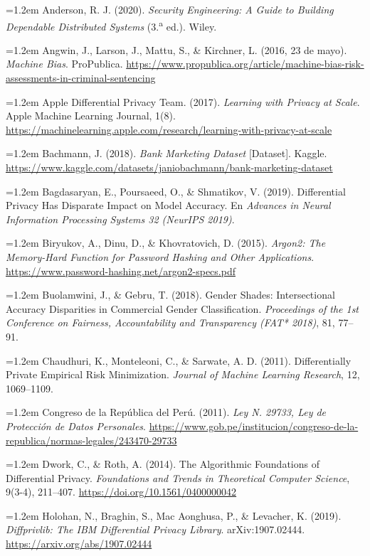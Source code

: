 \documentclass[11pt,a4paper]{article}
\newcommand{\refitem}[1]{\par\noindent\hangindent=1.2em\hangafter=1 #1\par\smallskip}
\begin{document}
\refitem{Anderson, R. J. (2020). \emph{Security Engineering: A Guide to Building Dependable
Distributed Systems} (3.\textsuperscript{a} ed.). Wiley.}

\refitem{Angwin, J., Larson, J., Mattu, S., \& Kirchner, L. (2016, 23 de mayo). \emph{Machine
Bias}. ProPublica. \url{https://www.propublica.org/article/machine-bias-risk-assessments-in-criminal-sentencing}}

\refitem{Apple Differential Privacy Team. (2017). \emph{Learning with Privacy at Scale}. Apple
Machine Learning Journal, 1(8). \url{https://machinelearning.apple.com/research/learning-with-privacy-at-scale}}

\refitem{Bachmann, J. (2018). \emph{Bank Marketing Dataset} [Dataset]. Kaggle.
\url{https://www.kaggle.com/datasets/janiobachmann/bank-marketing-dataset}}

\refitem{Bagdasaryan, E., Poursaeed, O., \& Shmatikov, V. (2019). Differential Privacy Has
Disparate Impact on Model Accuracy. En \emph{Advances in Neural Information Processing Systems 32
(NeurIPS 2019)}.}

\refitem{Biryukov, A., Dinu, D., \& Khovratovich, D. (2015). \emph{Argon2: The Memory-Hard
Function for Password Hashing and Other Applications}.
\url{https://www.password-hashing.net/argon2-specs.pdf}}

\refitem{Buolamwini, J., \& Gebru, T. (2018). Gender Shades: Intersectional Accuracy Disparities
in Commercial Gender Classification. \emph{Proceedings of the 1st Conference on Fairness,
Accountability and Transparency (FAT* 2018)}, 81, 77--91.}

\refitem{Chaudhuri, K., Monteleoni, C., \& Sarwate, A. D. (2011). Differentially Private
Empirical Risk Minimization. \emph{Journal of Machine Learning Research}, 12, 1069--1109.}

\refitem{Congreso de la República del Perú. (2011). \emph{Ley N.\textdegree{} 29733, Ley de
Protección de Datos Personales}.
\url{https://www.gob.pe/institucion/congreso-de-la-republica/normas-legales/243470-29733}}

\refitem{Dwork, C., \& Roth, A. (2014). The Algorithmic Foundations of Differential Privacy.
\emph{Foundations and Trends in Theoretical Computer Science}, 9(3-4), 211--407.
\url{https://doi.org/10.1561/0400000042}}

\refitem{Holohan, N., Braghin, S., Mac Aonghusa, P., \& Levacher, K. (2019). \emph{Diffprivlib:
The IBM Differential Privacy Library}. arXiv:1907.02444. \url{https://arxiv.org/abs/1907.02444}}
\end{document}
